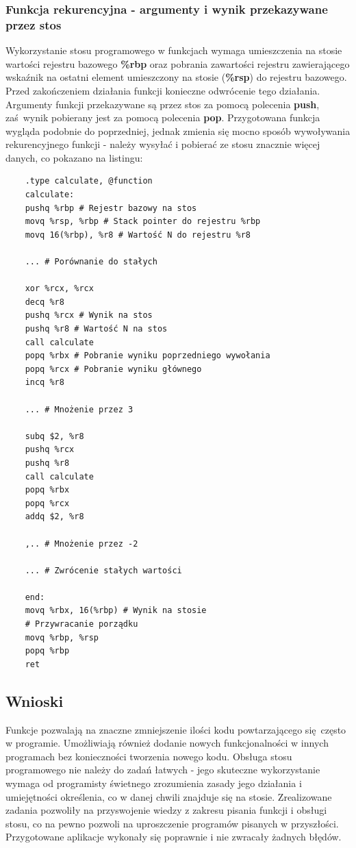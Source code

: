 \documentclass[a4paper,12pt]{article}
\begin{document}
\subsubsection{Funkcja rekurencyjna - argumenty i wynik przekazywane przez stos}
Wykorzystanie stosu programowego w funkcjach wymaga umieszczenia na stosie wartości rejestru bazowego \textbf{\%rbp} oraz pobrania zawartości rejestru zawierającego wskaźnik na ostatni element umieszczony na stosie (\textbf{\%rsp}) do rejestru bazowego. Przed zakończeniem działania funkcji konieczne odwrócenie tego działania. Argumenty funkcji przekazywane są przez stos za pomocą polecenia \textbf{push}, zaś wynik pobierany jest za pomocą polecenia \textbf{pop}. Przygotowana funkcja wygląda podobnie do poprzedniej, jednak zmienia się mocno sposób wywoływania rekurencyjnego funkcji - należy wysyłać i pobierać ze stosu znacznie więcej danych, co pokazano na listingu:
\begin{verbatim}
	.type calculate, @function
	calculate:
	pushq %rbp # Rejestr bazowy na stos
	movq %rsp, %rbp # Stack pointer do rejestru %rbp
	movq 16(%rbp), %r8 # Wartość N do rejestru %r8
	
	... # Porównanie do stałych
	
	xor %rcx, %rcx
	decq %r8
	pushq %rcx # Wynik na stos
	pushq %r8 # Wartość N na stos
	call calculate
	popq %rbx # Pobranie wyniku poprzedniego wywołania
	popq %rcx # Pobranie wyniku głównego
	incq %r8

	... # Mnożenie przez 3
	
	subq $2, %r8
	pushq %rcx
	pushq %r8
	call calculate
	popq %rbx
	popq %rcx
	addq $2, %r8
	
	,.. # Mnożenie przez -2
	
	... # Zwrócenie stałych wartości
	
	end:
	movq %rbx, 16(%rbp) # Wynik na stosie
	# Przywracanie porządku
	movq %rbp, %rsp
	popq %rbp
	ret
\end{verbatim}
\subsection{Wnioski}
Funkcje pozwalają na znaczne zmniejszenie ilości kodu powtarzającego się często w programie. Umożliwiają również dodanie nowych funkcjonalności w innych programach bez konieczności tworzenia nowego kodu. Obsługa stosu programowego nie należy do zadań łatwych - jego skuteczne wykorzystanie wymaga od programisty świetnego zrozumienia zasady jego działania i umiejętności określenia, co w danej chwili znajduje się na stosie. Zrealizowane zadania pozwoliły na przyswojenie wiedzy z zakresu pisania funkcji i obsługi stosu, co na pewno pozwoli na uproszczenie programów pisanych w przyszłości. Przygotowane aplikacje wykonały się poprawnie i nie zwracały żadnych błędów.
\newpage
\end{document}
